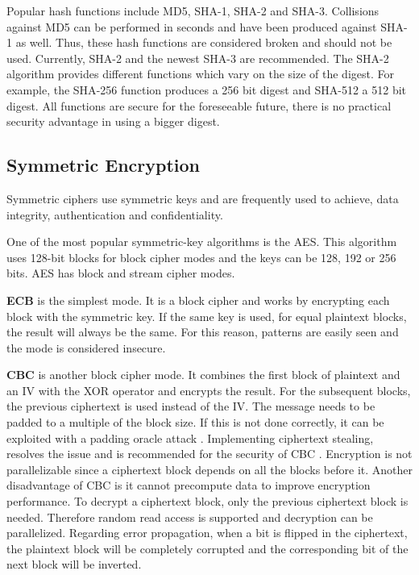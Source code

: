 Popular hash functions include MD5, \ac{SHA}-1, \ac{SHA}-2 and \ac{SHA}-3. Collisions against MD5 can be performed in seconds and have been produced against \ac{SHA}-1 as well. Thus, these hash functions are considered broken and should not be used. Currently, \ac{SHA}-2 and the newest \ac{SHA}-3 are recommended. The \ac{SHA}-2 algorithm provides different functions which vary on the size of the digest. For example, the \ac{SHA}-256 function produces a 256 bit digest and \ac{SHA}-512 a 512 bit digest. All functions are secure for the foreseeable future, there is no practical security advantage in using a bigger digest.

\subsection{Symmetric Encryption}\label{chap:background:crypto:symmetric}

Symmetric ciphers use symmetric keys and are frequently used to achieve, data integrity, authentication and confidentiality.

One of the most popular symmetric-key algorithms is the \ac{AES}. This algorithm uses 128-bit blocks for block cipher modes and the keys can be 128, 192 or 256 bits. \ac{AES} has block and stream cipher modes.

\textbf{\ac{ECB}} is the simplest mode. It is a block cipher and works by encrypting each block with the symmetric key. If the same key is used, for equal plaintext blocks, the result will always be the same. For this reason, patterns are easily seen and the mode is considered insecure.

\textbf{\ac{CBC}} is another block cipher mode. It combines the first block of plaintext and an IV with the XOR operator and encrypts the result. For the subsequent blocks, the previous ciphertext is used instead of the IV. The message needs to be padded to a multiple of the block size. If this is not done correctly, it can be exploited with a padding oracle attack \cite{paddingoracle}. Implementing ciphertext stealing, resolves the issue and is recommended for the security of \ac{CBC} \cite{ciphertextstealing}.
Encryption is not parallelizable since a ciphertext block depends on all the blocks before it. Another disadvantage of \ac{CBC} is it cannot precompute data to improve encryption performance.
To decrypt a ciphertext block, only the previous ciphertext block is needed. Therefore random read access is supported and decryption can be parallelized.
Regarding error propagation, when a bit is flipped in the ciphertext, the plaintext block will be completely corrupted and the corresponding bit of the next block will be inverted.

